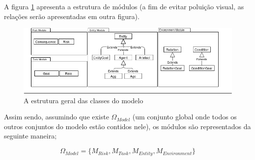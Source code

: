 A figura \ref{module} apresenta a estrutura de módulos (a fim de evitar poluição visual, as relações serão apresentadas
em outra figura). 

\begin{figure}[H]
  \centering
  \includegraphics[width=1\linewidth]{figure/Module.png} 
  \caption{A estrutura geral das classes do modelo}
  \label{module}
\end{figure}

Assim sendo, assumindo que existe $\Omega_{Model}$ (um conjunto global onde todos os outros conjuntos do modelo estão 
contidos nele), os módulos são representados da seguinte maneira; 

\begin{equation} 
    \Omega_{Model} = \{ M_{Risk}, M_{Task}, M_{Entity}, M_{Environment}\}
\end{equation}
\label{modules}
